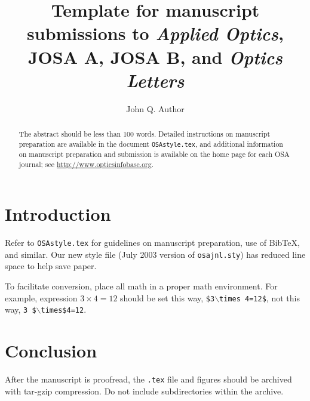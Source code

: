 \documentclass[12pt,letterpaper]{article}          %
\begin{document}
\title{Template for manuscript submissions to \emph{Applied Optics}, JOSA A, JOSA B, and \emph{Optics Letters}}

\author{John Q. Author}

\address{Publications Department, Optical Society of America,
\\  2010 Massachusetts Avenue, N.W., Washington, D.C. 20036}


\begin{abstract}The abstract should be less than 100 words. 
Detailed instructions on manuscript preparation are available in the document \texttt{OSAstyle.tex},  and additional information on manuscript
preparation and submission is available on the home page for each
OSA journal; see \mbox{\href{http://www.opticsinfobase.org}{http://www.opticsinfobase.org}}.
\end{abstract}


\maketitle %

\section{Introduction}
Refer to \texttt{OSAstyle.tex} for guidelines on manuscript preparation, use of \mbox{Bib\TeX}, and similar. Our new style file (July 2003 version of \texttt{osajnl.sty}) has reduced line space to help save paper.

To facilitate conversion, place all math in a proper math environment. For example, expression $3\times 4 = 12$ should be set this way, \texttt{\$3$\backslash$times 4=12\$}, not this way, \texttt{3 \$$\backslash$times\$4=12}.
\section{Conclusion}

After the manuscript is proofread, the {\tt .tex} file and figures
should be archived with tar-gzip compression. Do not include
subdirectories within the archive.
\end{document}
